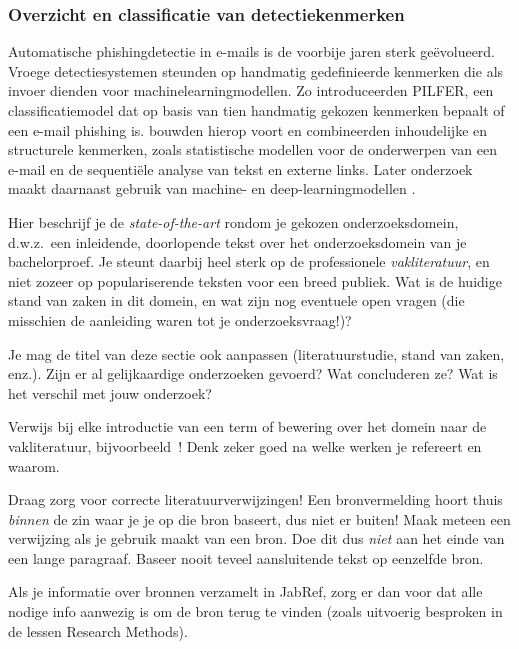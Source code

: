 \subsubsection{Overzicht en classificatie van detectiekenmerken}
\label{subsubsec:Overzicht en classificatie van detectiekenmerken}
Automatische phishingdetectie in e-mails is de voorbije jaren sterk geëvolueerd. Vroege detectiesystemen steunden op handmatig gedefinieerde kenmerken die als invoer dienden voor machinelearningmodellen. Zo introduceerden \textcite{Fette2007} PILFER, een classificatiemodel dat op basis van tien handmatig gekozen kenmerken bepaalt  of een e-mail phishing is. \textcite{Bergholz2010} bouwden hierop voort en combineerden  inhoudelijke en structurele kenmerken, zoals statistische modellen voor de onderwerpen van een e-mail en de sequentiële analyse van tekst en externe links. Later onderzoek maakt  daarnaast gebruik van machine- en deep-learningmodellen \autocite{Salloum2022}.

Hier beschrijf je de \emph{state-of-the-art} rondom je gekozen onderzoeksdomein, d.w.z.\ een inleidende, doorlopende tekst over het onderzoeksdomein van je bachelorproef. Je steunt daarbij heel sterk op de professionele \emph{vakliteratuur}, en niet zozeer op populariserende teksten voor een breed publiek. Wat is de huidige stand van zaken in dit domein, en wat zijn nog eventuele open vragen (die misschien de aanleiding waren tot je onderzoeksvraag!)?

Je mag de titel van deze sectie ook aanpassen (literatuurstudie, stand van zaken, enz.). Zijn er al gelijkaardige onderzoeken gevoerd? Wat concluderen ze? Wat is het verschil met jouw onderzoek?

Verwijs bij elke introductie van een term of bewering over het domein naar de vakliteratuur, bijvoorbeeld~\autocite{Hykes2013}! Denk zeker goed na welke werken je refereert en waarom.

Draag zorg voor correcte literatuurverwijzingen! Een bronvermelding hoort thuis \emph{binnen} de zin waar je je op die bron baseert, dus niet er buiten! Maak meteen een verwijzing als je gebruik maakt van een bron. Doe dit dus \emph{niet} aan het einde van een lange paragraaf. Baseer nooit teveel aansluitende tekst op eenzelfde bron.

Als je informatie over bronnen verzamelt in JabRef, zorg er dan voor dat alle nodige info aanwezig is om de bron terug te vinden (zoals uitvoerig besproken in de lessen Research Methods).


